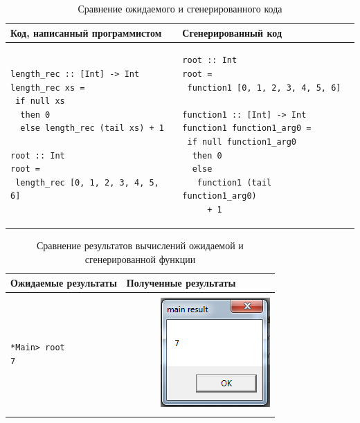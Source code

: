 \begin{table}[h]
\centering
\begin{tabular}{|l|l|}
\hline
Код, написанный программистом &
Сгенерированный код \\
\hline
\begin{lstlisting}
length_rec :: [Int] -> Int
length_rec xs = 
 if null xs
  then 0
  else length_rec (tail xs) + 1

root :: Int
root = 
 length_rec [0, 1, 2, 3, 4, 5, 6]
\end{lstlisting} &
\begin{lstlisting}
root :: Int
root = 
 function1 [0, 1, 2, 3, 4, 5, 6]

function1 :: [Int] -> Int
function1 function1_arg0 = 
 if null function1_arg0
  then 0
  else 
   function1 (tail function1_arg0)
     + 1
\end{lstlisting} \\
\hline
\end{tabular}
\caption{Сравнение ожидаемого и сгенерированного кода}\label{expectreal}
\end{table}

\begin{table}[h]
\centering
\begin{tabular}{|l|l|}
\hline
Ожидаемые результаты & Полученные результаты \\
\hline
 & \\
\begin{minipage}{2in}
	\begin{verbatim}
*Main> root
7
	\end{verbatim}
\end{minipage} &
~~~~~~~\includegraphics{img/result.PNG} \\
 & \\
\hline
\end{tabular}
\caption{Сравнение результатов вычислений ожидаемой и сгенерированной функции}\label{exprealres}
\end{table}

